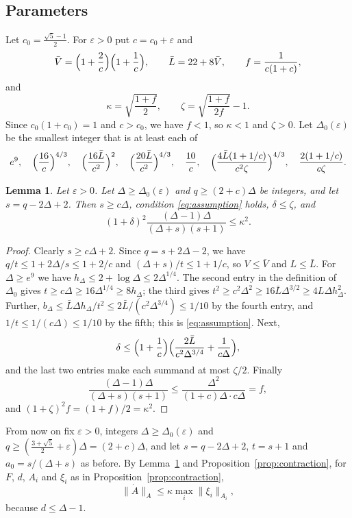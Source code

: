 \documentclass{amsart}
\numberwithin{equation}{section}
\theoremstyle{plain}
\newtheorem{lemma}[theorem]{Lemma}
\theoremstyle{definition}
\theoremstyle{remark}
\begin{document}
\subsection{Parameters}
Let $c_0=\frac{\sqrt5-1}{2}$. For $\varepsilon>0$ put $c=c_0+\varepsilon$ and
\[
\bar V=\Bigl(1+\frac2c\Bigr)\Bigl(1+\frac1c\Bigr),\qquad\bar L=22+8\bar V,\qquad f=\frac1{c(1+c)},
\]
and
\[
\kappa=\sqrt{\frac{1+f}{2}},\qquad\zeta=\sqrt{\frac{1+f}{2f}}-1 .
\]
Since $c_0(1+c_0)=1$ and $c>c_0$, we have $f<1$, so $\kappa<1$ and $\zeta>0$. Let $\Delta_0(\varepsilon)$ be the smallest integer that is at least each of
\[
e^9,\quad\Bigl(\frac{16}{c}\Bigr)^{4/3},\quad\Bigl(\frac{16\bar L}{c^2}\Bigr)^{2},\quad\Bigl(\frac{20\bar L}{c^2}\Bigr)^{4/3},\quad\frac{10}{c},\quad\Bigl(\frac{4\bar L(1+1/c)}{c^2\zeta}\Bigr)^{4/3},\quad\frac{2(1+1/c)}{c\zeta}.
\]

\begin{lemma}\label{lem:parameters}
Let $\varepsilon>0$. Let $\Delta\ge\Delta_0(\varepsilon)$ and $q\ge(2+c)\Delta$ be integers, and let $s=q-2\Delta+2$. Then $s\ge c\Delta$, condition \eqref{eq:assumption} holds, $\delta\le\zeta$, and
\[
(1+\delta)^2\frac{(\Delta-1)\Delta}{(\Delta+s)(s+1)}\le\kappa^2 .
\]
\end{lemma}

\begin{proof}
Clearly $s\ge c\Delta+2$. Since $q=s+2\Delta-2$, we have $q/t\le1+2\Delta/s\le1+2/c$ and $(\Delta+s)/t\le1+1/c$, so $V\le\bar V$ and $L\le\bar L$. For $\Delta\ge e^9$ we have $h_\Delta\le2+\log\Delta\le2\Delta^{1/4}$. The second entry in the definition of $\Delta_0$ gives $t\ge c\Delta\ge16\Delta^{1/4}\ge8h_\Delta$; the third gives $t^2\ge c^2\Delta^2\ge16\bar L\Delta^{3/2}\ge4L\Delta h_\Delta^2$. Further, $b_\Delta\le\bar L\Delta h_\Delta/t^2\le2\bar L/(c^2\Delta^{3/4})\le1/10$ by the fourth entry, and $1/t\le1/(c\Delta)\le1/10$ by the fifth; this is \eqref{eq:assumption}. Next,
\[
\delta\le\Bigl(1+\frac1c\Bigr)\Bigl(\frac{2\bar L}{c^2\Delta^{3/4}}+\frac1{c\Delta}\Bigr),
\]
and the last two entries make each summand at most $\zeta/2$. Finally
\[
\frac{(\Delta-1)\Delta}{(\Delta+s)(s+1)}\le\frac{\Delta^2}{(1+c)\Delta\cdot c\Delta}=f,
\]
and $(1+\zeta)^2f=(1+f)/2=\kappa^2$.
\end{proof}

From now on fix $\varepsilon>0$, integers $\Delta\ge\Delta_0(\varepsilon)$ and $q\ge(\frac{3+\sqrt5}{2}+\varepsilon)\Delta=(2+c)\Delta$, and let $s=q-2\Delta+2$, $t=s+1$ and $a_0=s/(\Delta+s)$ as before. By Lemma~\ref{lem:parameters} and Proposition~\ref{prop:contraction}, for $F$, $d$, $A_i$ and $\xi_i$ as in Proposition~\ref{prop:contraction},
\begin{equation}\label{eq:contraction}
\|\dot A\|_A\le\kappa\max_i\|\xi_i\|_{A_i},
\end{equation}
because $d\le\Delta-1$.
\end{document}
